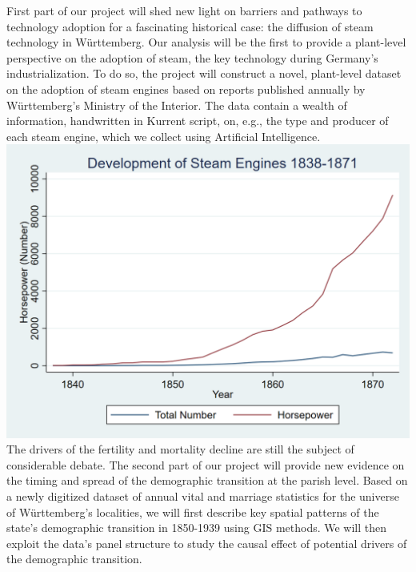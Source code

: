 \documentclass[25pt,a0paper, portrait, colspace = 0.5cm, blockverticalspace = 5mm]{tikzposter}
\begin{document}
\begin{columns}
    {First part of our project will shed new light on barriers and pathways to technology adoption for a fascinating historical case: the diffusion of steam technology in Württemberg. Our analysis will be the first to provide a plant-level perspective on the adoption of steam, the key technology during Germany’s industrialization. To do so, the project will construct a novel, plant-level dataset on the adoption of steam engines based on reports published annually by Württemberg’s Ministry of the Interior. The data contain a wealth of information, handwritten in Kurrent script, on, e.g., the type and producer of each steam engine, which we collect using Artificial Intelligence.\\
   	\includegraphics[width=\linewidth]{steamengines.png}
	}
	{The drivers of the fertility and mortality decline are still the subject of considerable debate. The second part of our project will provide new evidence on the timing and spread of the demographic transition at the parish level. Based on a newly digitized dataset of annual vital and marriage statistics for the universe of Württemberg’s localities, we will first describe key spatial patterns of the state’s demographic transition in 1850-1939 using GIS methods. We will then exploit the data’s panel structure to study the causal effect of potential drivers of the demographic transition.\\
}
\end{columns}
\end{document}
